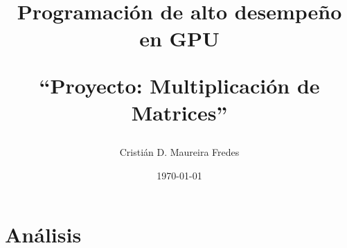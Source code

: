 \documentclass[letter, 10pt]{article}
\begin{document}
\pagestyle{empty}

\title{Programación de alto desempeño en GPU\\ \begin{Large}``Proyecto: Multiplicación de Matrices''\end{Large}}
\author{Cristián D. Maureira Fredes}
\date{\today}
\maketitle

\section{Análisis}
\label{sec:analisis}

\end{document}
